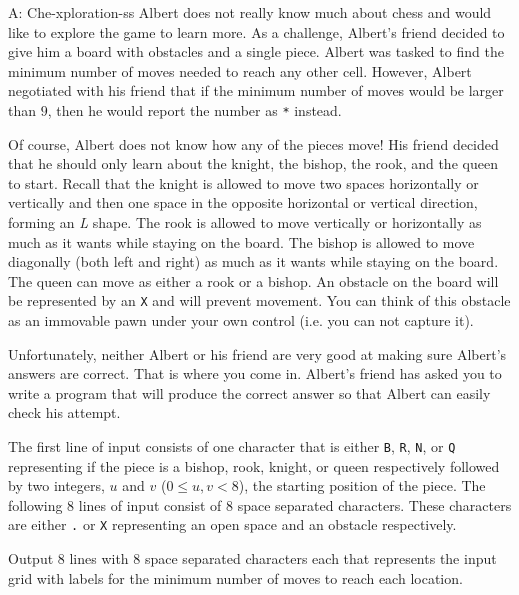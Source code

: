 \begin{problem}{A: Che-xploration-ss}
Albert does not really know much about chess and would like to explore the game to learn more.
As a challenge, Albert's friend decided to give him a board with obstacles and a single piece.
Albert was tasked to find the minimum number of moves needed to reach any other cell.
However, Albert negotiated with his friend that if the minimum number of moves would be larger than $9$, then he would report the number as \texttt{*} instead.

Of course, Albert does not know how any of the pieces move!
His friend decided that he should only learn about the knight, the bishop, the rook, and the queen to start.
Recall that the knight is allowed to move two spaces horizontally or vertically and then one space in the opposite horizontal or vertical direction, forming an \textit{L} shape.
The rook is allowed to move vertically or horizontally as much as it wants while staying on the board.
The bishop is allowed to move diagonally (both left and right) as much as it wants while staying on the board.
The queen can move as either a rook or a bishop.
An obstacle on the board will be represented by an \texttt{X} and will prevent movement.
You can think of this obstacle as an immovable pawn under your own control (i.e. you can not capture it).

Unfortunately, neither Albert or his friend are very good at making sure Albert's answers are correct.
That is where you come in.
Albert's friend has asked you to write a program that will produce the correct answer so that Albert can easily check his attempt.
\end{problem}

\begin{formalin}
The first line of input consists of one character that is either \texttt{B}, \texttt{R}, \texttt{N}, or \texttt{Q} representing if the piece is a bishop, rook, knight, or queen respectively followed by two integers, $u$ and $v$ ($0 \le u, v < 8$), the starting position of the piece.
The following 8 lines of input consist of 8 space separated characters.
These characters are either \texttt{.} or \texttt{X} representing an open space and an obstacle respectively.
\end{formalin}

\begin{formalout}
Output 8 lines with 8 space separated characters each that represents the input grid with labels for the minimum number of moves to reach each location.
\end{formalout}

